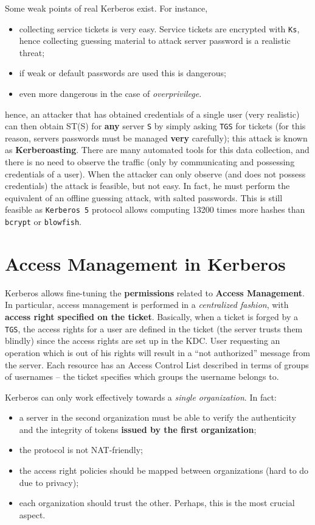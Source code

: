 \documentclass[10pt]{\classname}
\begin{document}
Some weak points of real Kerberos exist. For instance,
\begin{itemize}
    \item collecting service tickets is very easy. Service tickets are
        encrypted with \texttt{Ks}, hence collecting guessing material to
        attack server password is a realistic threat;
    \item if weak or default passwords are used this is dangerous;
    \item even more dangerous in the case of \emph{overprivilege}.
\end{itemize}
hence, an attacker that has obtained credentials of a single user (very
realistic) can then obtain ST(S) for \textbf{any} server \texttt{S} by simply
asking \texttt{TGS} for tickets (for this reason, servers passwords must be
managed \textbf{very} carefully); this attack is known as
\textbf{Kerberoasting}. There are many automated tools for this data
collection, and there is no need to observe the traffic (only by communicating
and possessing credentials of a user). When the attacker can only observe (and
does not possess credentials) the attack is feasible, but not easy. In fact, he
must perform the equivalent of an offline guessing attack, with salted
passwords. This is still feasible as \texttt{Kerberos 5} protocol allows
computing 13200 times more hashes than \texttt{bcrypt} or \texttt{blowfish}.

\section{Access Management in Kerberos}

Kerberos allows fine\--tuning the \textbf{permissions} related to
\textbf{Access Management}. In particular, access management is performed in a
\emph{centralized fashion}, with \textbf{access right specified on the ticket}.
Basically, when a ticket is forged by a \texttt{TGS}, the access rights for a
user are defined in the ticket (the server trusts them blindly) since the
access rights are set up in the KDC. User requesting an operation which is out
of his rights will result in a ``not authorized'' message from the server. Each
resource has an Access Control List described in terms of groups of usernames
-- the ticket specifies which groups the username belongs to.

Kerberos can only work effectively towards a \emph{single organization}. In fact:
\begin{itemize}
    \item a server in the second organization must be able to verify the
        authenticity and the integrity of tokens \textbf{issued by the first
        organization};
    \item the protocol is not NAT\--friendly;
    \item the access right policies should be mapped between organizations
        (hard to do due to privacy);
    \item each organization should trust the other. Perhaps, this is the most
        crucial aspect.
\end{itemize}
\end{document}
